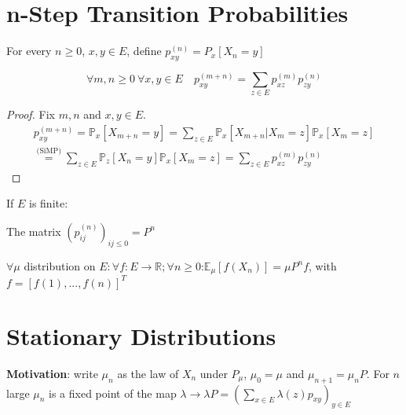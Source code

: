 \noindent
\section{n-Step Transition Probabilities}
\begin{defn}
	For every $n\geq0$, $x, y \in E$, define $p_{xy}^{(n)}=P_x[X_n=y]$
\end{defn}

\begin{prop}
\begin{equation}
	\forall m,n \geq 0 \ \forall x,y \in E \quad \boxed{ p_{xy}^{(m+n)}= \sum_{z \in E} p_{xz}^{(m)}p_{zy}^{(n)}}
\end{equation}
	
\end{prop}
\begin{proof}
Fix $m,n$ and $x,y \in E$.
	\begin{align}
		p_{xy}^{(m+n)} =\mathbb{P}_{x} \left[ X_{m+n}=y \right] = \sum_{z \in E}^{} \mathbb{P}_{x} \left[ X_{m+n} | X_m = z \right] \mathbb{P}_{x} \left[ X_m = z \right] \\
		\stackrel{\textrm{(SiMP)}}{=} \sum_{z \in E}^{} \mathbb{P}_{z} \left[ X_n=y \right] \mathbb{P}_{x} \left[ X_m=z \right] = \sum_{z \in E}^{} p_{xz}^{(m)} p_{zy}^{(n)}  	
	\end{align}
	
\end{proof}


\begin{rmk}[]
	If $E$ is finite:
\itemize
\item The matrix $(p_{ij}^{(n)})_{ij \leq 0}=P^n$
\item $\forall  \mu$ distribution on $E: \forall f:E \to \mathbb{R}; \forall n \geq0$:\quad $\mathbb{E}_{\mu} \left[ f(X_n) \right] = \mu P^n f$, with $f = [f(1),...,f(n)]^T$
\end{rmk}

\section{Stationary Distributions}
\textbf{Motivation}: write $\mu_{n}$ as the law of $X_{n}$ under $P_{\mu}$, $\mu_0=\mu$ and $\mu_{n+1}=\mu_{n}P$. For $n$ large $\mu_n$ is a fixed point of the map $\lambda \to \lambda P = \left( \sum_{x \in E} \lambda(z)p_{xy} \right)_{y \in E}$

